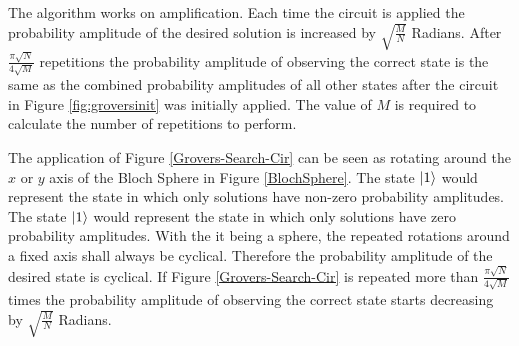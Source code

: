 The algorithm works on amplification.
Each time the circuit is applied the probability amplitude of the desired solution is increased by $\sqrt{\frac{M}{N}}$ Radians.
After $\frac{\pi\sqrt{N}}{4\sqrt{M}}$ repetitions the probability amplitude of observing the correct state is the same as the combined probability amplitudes of all other states after the circuit in Figure \ref{fig:groversinit} was initially applied.
The value of $M$ is required to calculate the number of repetitions to perform.

The application of Figure \ref{Grovers-Search-Cir} can be seen as rotating around the $x$ or $y$ axis of the Bloch Sphere in Figure \ref{BlochSphere}.
The state $\left\vert{1}\right\rangle$ would represent the state in which only solutions have non-zero probability amplitudes.
The state $\left\vert{1}\right\rangle$ would represent the state in which only solutions have zero probability amplitudes.
With the it being a sphere, the repeated rotations around a fixed axis shall always be cyclical.
Therefore the probability amplitude of the desired state is cyclical.
If Figure \ref{Grovers-Search-Cir} is repeated more than $\frac{\pi\sqrt{N}}{4\sqrt{M}}$ times the probability amplitude of observing the correct state starts decreasing by $\sqrt{\frac{M}{N}}$ Radians.

